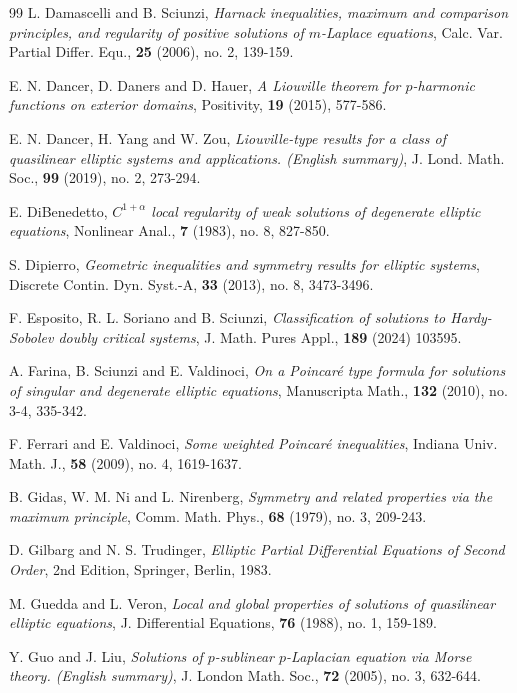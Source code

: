 \documentclass[12pt]{amsart}
\theoremstyle{definition}
\theoremstyle{remark}
\theoremstyle{conclusion}
\theoremstyle{conjecture}
\numberwithin{equation}{section}
\begin{document}
\begin{thebibliography}{99}
 L. Damascelli and B. Sciunzi, {\it Harnack inequalities, maximum and comparison principles, and regularity of positive solutions of $m$-Laplace equations}, Calc. Var. Partial Differ. Equ., \textbf{25} (2006), no. 2, 139-159.

 E. N. Dancer, D. Daners and D. Hauer, {\it A Liouville theorem for $p$-harmonic functions on exterior domains}, Positivity, \textbf{19} (2015), 577-586.

 E. N. Dancer, H. Yang and W. Zou, {\it Liouville-type results for a class of quasilinear elliptic systems and applications. (English summary)}, J. Lond. Math. Soc., \textbf{99} (2019), no. 2, 273-294.

 E. DiBenedetto, {\it $C^{1+\alpha}$ local regularity of weak solutions of degenerate elliptic equations}, Nonlinear Anal., \textbf{7} (1983), no. 8, 827-850.

 S. Dipierro, {\it Geometric inequalities and symmetry results for elliptic systems}, Discrete Contin. Dyn. Syst.-A, \textbf{33} (2013), no. 8, 3473-3496.

 F. Esposito, R. L. Soriano and  B. Sciunzi, {\it Classification of solutions to Hardy-Sobolev doubly critical systems}, J. Math. Pures Appl., \textbf{189} (2024) 103595.

 A. Farina, B. Sciunzi and E. Valdinoci, {\it On a Poincar\'{e} type formula for solutions of singular and degenerate elliptic equations}, Manuscripta Math., \textbf{132} (2010), no. 3-4, 335-342.

 F. Ferrari and E. Valdinoci, {\it Some weighted Poincar\'{e} inequalities}, Indiana Univ. Math. J., \textbf{58} (2009), no. 4, 1619-1637.

 B. Gidas, W. M. Ni and L. Nirenberg, {\it Symmetry and related properties via the maximum principle}, Comm. Math. Phys., \textbf{68} (1979), no. 3, 209-243.

 D. Gilbarg and N. S. Trudinger, {\it Elliptic Partial Differential Equations of Second Order}, 2nd Edition, Springer, Berlin, 1983.

 M. Guedda and L. Veron, {\it Local and global properties of solutions of quasilinear elliptic equations}, J. Differential Equations, \textbf{76} (1988), no. 1, 159-189.

 Y. Guo and J. Liu, {\it Solutions of $p$-sublinear $p$-Laplacian equation via Morse theory. (English summary)}, J. London Math. Soc., \textbf{72} (2005), no. 3, 632-644.


\end{thebibliography}
\end{document}
